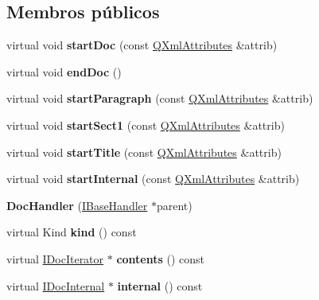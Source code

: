 \subsection*{Membros públicos}
\begin{DoxyCompactItemize}
\item 
\hypertarget{class_doc_handler_ad84dac4fe252a8dd4fe893fd9b7d1658}{virtual void {\bfseries start\-Doc} (const \hyperlink{class_q_xml_attributes}{Q\-Xml\-Attributes} \&attrib)}\label{class_doc_handler_ad84dac4fe252a8dd4fe893fd9b7d1658}

\item 
\hypertarget{class_doc_handler_a815eab18c432189f195bd4e38b54b19f}{virtual void {\bfseries end\-Doc} ()}\label{class_doc_handler_a815eab18c432189f195bd4e38b54b19f}

\item 
\hypertarget{class_doc_handler_abb7f955561480002949ada58092c1964}{virtual void {\bfseries start\-Paragraph} (const \hyperlink{class_q_xml_attributes}{Q\-Xml\-Attributes} \&attrib)}\label{class_doc_handler_abb7f955561480002949ada58092c1964}

\item 
\hypertarget{class_doc_handler_a2c6f3a579b66785157c13f793b7a0507}{virtual void {\bfseries start\-Sect1} (const \hyperlink{class_q_xml_attributes}{Q\-Xml\-Attributes} \&attrib)}\label{class_doc_handler_a2c6f3a579b66785157c13f793b7a0507}

\item 
\hypertarget{class_doc_handler_a542aae01d1b2fae60d3c4dd0b77f6669}{virtual void {\bfseries start\-Title} (const \hyperlink{class_q_xml_attributes}{Q\-Xml\-Attributes} \&attrib)}\label{class_doc_handler_a542aae01d1b2fae60d3c4dd0b77f6669}

\item 
\hypertarget{class_doc_handler_ae252c8def30c9ccd26a72227211e309e}{virtual void {\bfseries start\-Internal} (const \hyperlink{class_q_xml_attributes}{Q\-Xml\-Attributes} \&attrib)}\label{class_doc_handler_ae252c8def30c9ccd26a72227211e309e}

\item 
\hypertarget{class_doc_handler_aa350f51b7bc161d7dbf3528c1e2a5511}{{\bfseries Doc\-Handler} (\hyperlink{class_i_base_handler}{I\-Base\-Handler} $\ast$parent)}\label{class_doc_handler_aa350f51b7bc161d7dbf3528c1e2a5511}

\item 
\hypertarget{class_doc_handler_af8e62c8a81ddf2283205cc8955de50eb}{virtual Kind {\bfseries kind} () const }\label{class_doc_handler_af8e62c8a81ddf2283205cc8955de50eb}

\item 
\hypertarget{class_doc_handler_a6f867db5d47aa2210c77df9bc5953008}{virtual \hyperlink{class_i_doc_iterator}{I\-Doc\-Iterator} $\ast$ {\bfseries contents} () const }\label{class_doc_handler_a6f867db5d47aa2210c77df9bc5953008}

\item 
\hypertarget{class_doc_handler_afdba1256a0346488b335029a23b1f18b}{virtual \hyperlink{class_i_doc_internal}{I\-Doc\-Internal} $\ast$ {\bfseries internal} () const }\label{class_doc_handler_afdba1256a0346488b335029a23b1f18b}

\end{DoxyCompactItemize}
